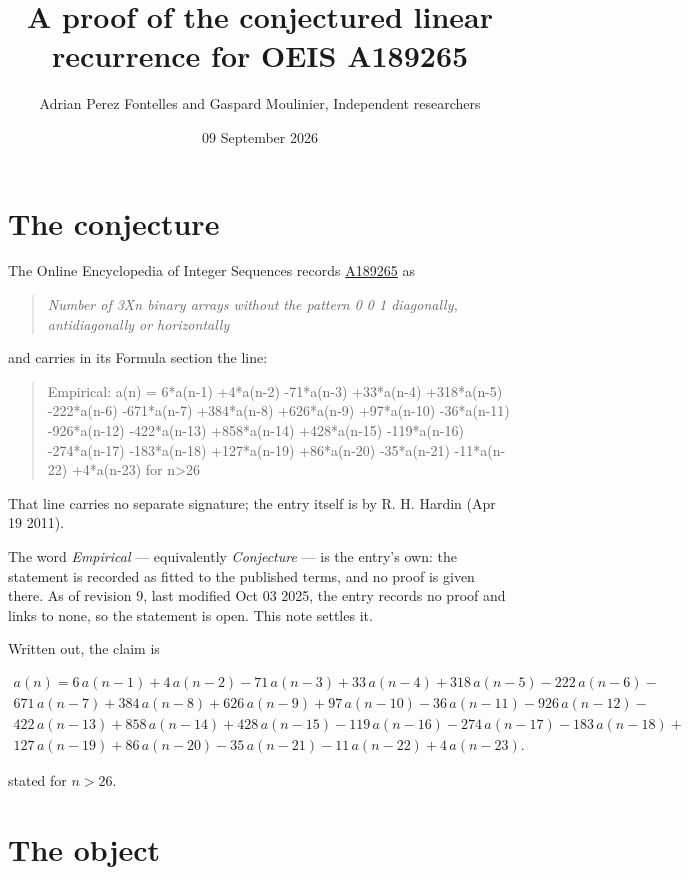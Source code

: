 \documentclass[11pt]{article}
\title{A proof of the conjectured linear recurrence for OEIS A189265}
\author{Adrian Perez Fontelles and Gaspard Moulinier, Independent researchers}
\date{09 September 2026}
\theoremstyle{definition}
\begin{document}
\maketitle
\section{The conjecture}

The Online Encyclopedia of Integer Sequences records \href{https://oeis.org/A189265}{A189265} as

\begin{quote}\itshape Number of 3Xn binary arrays without the pattern 0 0 1 diagonally, antidiagonally or horizontally\end{quote}

and carries in its Formula section the line:

\begin{quote}\ttfamily Empirical: a(n) = 6*a(n-1) +4*a(n-2) -71*a(n-3) +33*a(n-4) +318*a(n-5) -222*a(n-6) -671*a(n-7) +384*a(n-8) +626*a(n-9) +97*a(n-10) -36*a(n-11) -926*a(n-12) -422*a(n-13) +858*a(n-14) +428*a(n-15) -119*a(n-16) -274*a(n-17) -183*a(n-18) +127*a(n-19) +86*a(n-20) -35*a(n-21) -11*a(n-22) +4*a(n-23) for n>26\end{quote}

That line carries no separate signature; the entry itself is by R. H. Hardin (Apr 19 2011).

The word {\itshape Empirical} --- equivalently {\itshape Conjecture} --- is the entry's own: the statement is recorded as fitted to the published terms, and no proof is given there. As of revision 9, last modified Oct 03 2025, the entry records no proof and links to none, so the statement is open. This note settles it.

Written out, the claim is

\begin{multline*} a(n) = 6\,a(n-1) + 4\,a(n-2) - 71\,a(n-3) + 33\,a(n-4) + 318\,a(n-5) - 222\,a(n-6) - \\ 671\,a(n-7) + 384\,a(n-8) + 626\,a(n-9) + 97\,a(n-10) - 36\,a(n-11) - 926\,a(n-12) - \\ 422\,a(n-13) + 858\,a(n-14) + 428\,a(n-15) - 119\,a(n-16) - 274\,a(n-17) - 183\,a(n-18) + \\ 127\,a(n-19) + 86\,a(n-20) - 35\,a(n-21) - 11\,a(n-22) + 4\,a(n-23). \end{multline*}

stated for $n > 26$.

\section{The object}
\end{document}
